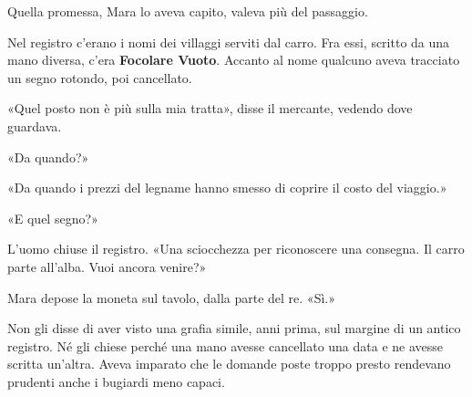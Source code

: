 \documentclass[10pt,a4paper]{article}
\begin{document}
Quella promessa, Mara lo aveva capito, valeva più del passaggio.

Nel registro c'erano i nomi dei villaggi serviti dal carro. Fra essi, scritto da una mano diversa, c'era \textbf{Focolare Vuoto}. Accanto al nome qualcuno aveva tracciato un segno rotondo, poi cancellato.

«Quel posto non è più sulla mia tratta», disse il mercante, vedendo dove guardava.

«Da quando?»

«Da quando i prezzi del legname hanno smesso di coprire il costo del viaggio.»

«E quel segno?»

L'uomo chiuse il registro. «Una sciocchezza per riconoscere una consegna. Il carro parte all'alba. Vuoi ancora venire?»

Mara depose la moneta sul tavolo, dalla parte del re. «Sì.»

Non gli disse di aver visto una grafia simile, anni prima, sul margine di un antico registro. Né gli chiese perché una mano avesse cancellato una data e ne avesse scritta un'altra. Aveva imparato che le domande poste troppo presto rendevano prudenti anche i bugiardi meno capaci.
\end{document}
